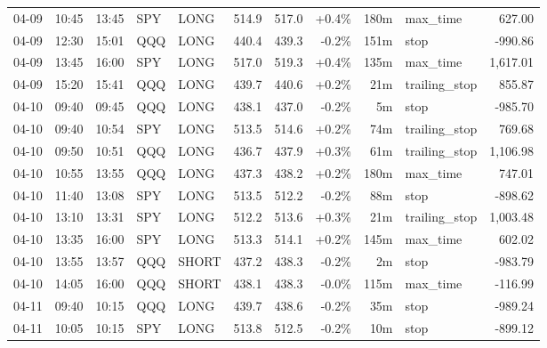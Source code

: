 \documentclass[11pt,a4paper,twoside]{article}
\begin{document}
\begin{center}
\begin{longtable}{>{\color{txtmain}}l l l l l r r r r >{\color{txtmain}}l r}
04-09 & 10:45 & 13:45 & SPY & LONG & 514.9 & 517.0 & \textcolor{wingreen}{+0.4\%} & 180m & max\_time & \textcolor{wingreen}{627.00} \\
04-09 & 12:30 & 15:01 & QQQ & LONG & 440.4 & 439.3 & \textcolor{lossred}{-0.2\%} & 151m & stop & \textcolor{lossred}{-990.86} \\
04-09 & 13:45 & 16:00 & SPY & LONG & 517.0 & 519.3 & \textcolor{wingreen}{+0.4\%} & 135m & max\_time & \textcolor{wingreen}{1,617.01} \\
04-09 & 15:20 & 15:41 & QQQ & LONG & 439.7 & 440.6 & \textcolor{wingreen}{+0.2\%} & 21m & trailing\_stop & \textcolor{wingreen}{855.87} \\
04-10 & 09:40 & 09:45 & QQQ & LONG & 438.1 & 437.0 & \textcolor{lossred}{-0.2\%} & 5m & stop & \textcolor{lossred}{-985.70} \\
04-10 & 09:40 & 10:54 & SPY & LONG & 513.5 & 514.6 & \textcolor{wingreen}{+0.2\%} & 74m & trailing\_stop & \textcolor{wingreen}{769.68} \\
04-10 & 09:50 & 10:51 & QQQ & LONG & 436.7 & 437.9 & \textcolor{wingreen}{+0.3\%} & 61m & trailing\_stop & \textcolor{wingreen}{1,106.98} \\
04-10 & 10:55 & 13:55 & QQQ & LONG & 437.3 & 438.2 & \textcolor{wingreen}{+0.2\%} & 180m & max\_time & \textcolor{wingreen}{747.01} \\
04-10 & 11:40 & 13:08 & SPY & LONG & 513.5 & 512.2 & \textcolor{lossred}{-0.2\%} & 88m & stop & \textcolor{lossred}{-898.62} \\
04-10 & 13:10 & 13:31 & SPY & LONG & 512.2 & 513.6 & \textcolor{wingreen}{+0.3\%} & 21m & trailing\_stop & \textcolor{wingreen}{1,003.48} \\
04-10 & 13:35 & 16:00 & SPY & LONG & 513.3 & 514.1 & \textcolor{wingreen}{+0.2\%} & 145m & max\_time & \textcolor{wingreen}{602.02} \\
04-10 & 13:55 & 13:57 & QQQ & SHORT & 437.2 & 438.3 & \textcolor{lossred}{-0.2\%} & 2m & stop & \textcolor{lossred}{-983.79} \\
04-10 & 14:05 & 16:00 & QQQ & SHORT & 438.1 & 438.3 & \textcolor{lossred}{-0.0\%} & 115m & max\_time & \textcolor{lossred}{-116.99} \\
04-11 & 09:40 & 10:15 & QQQ & LONG & 439.7 & 438.6 & \textcolor{lossred}{-0.2\%} & 35m & stop & \textcolor{lossred}{-989.24} \\
04-11 & 10:05 & 10:15 & SPY & LONG & 513.8 & 512.5 & \textcolor{lossred}{-0.2\%} & 10m & stop & \textcolor{lossred}{-899.12} \\

\end{longtable}
\end{center}
\end{document}
